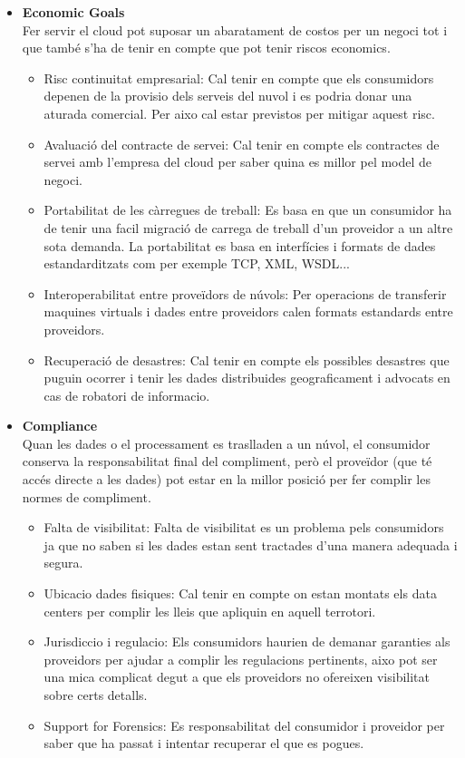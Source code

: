 \documentclass[a4paper, 10pt]{article}
\begin{document}
\begin{itemize}
    \item \textbf{Economic Goals}\\
    Fer servir el cloud pot suposar un abaratament de costos per un negoci tot i que també s'ha de tenir en compte que pot tenir riscos economics.
    \begin{itemize}
        \item Risc continuitat empresarial: Cal tenir en compte que els consumidors depenen de la provisio dels serveis del nuvol i es podria donar una aturada comercial. Per aixo cal estar previstos per mitigar aquest risc.
        \item Avaluació del contracte de servei: Cal tenir en compte els contractes de servei amb l'empresa del cloud per saber quina es millor pel model de negoci.
        \item Portabilitat de les càrregues de treball: Es basa en que un consumidor ha de tenir una facil migració de carrega de treball d'un proveidor a un altre sota demanda. La portabilitat es basa en interfícies i formats de dades estandarditzats com per exemple TCP, XML, WSDL...
        \item Interoperabilitat entre proveïdors de núvols: Per operacions de transferir maquines virtuals i dades entre proveidors calen formats estandards entre proveidors.
        \item Recuperació de desastres: Cal tenir en compte els possibles desastres que puguin ocorrer i tenir les dades distribuides geograficament i advocats en cas de robatori de informacio.
    \end{itemize}
    
    \item \textbf{Compliance}\\
    Quan les dades o el processament es traslladen a un núvol, el consumidor conserva la responsabilitat final del compliment, però el proveïdor (que té accés directe a les dades) pot estar en la millor posició per fer complir les normes de compliment.
    \begin{itemize}
        \item Falta de visibilitat: Falta de visibilitat es un problema pels consumidors ja que no saben si les dades estan sent tractades d'una manera adequada i segura.
        \item Ubicacio dades fisiques: Cal tenir en compte on estan montats els data centers per complir les lleis que apliquin en aquell terrotori.
        \item Jurisdiccio i regulacio: Els consumidors haurien de demanar garanties als proveidors per ajudar a complir les regulacions pertinents, aixo pot ser una mica complicat degut a que els proveidors no ofereixen visibilitat sobre certs detalls.
        \item Support for Forensics: Es responsabilitat del consumidor i proveidor per saber que ha passat i intentar recuperar el que es pogues.
    \end{itemize}
    

\end{itemize}
\end{document}
